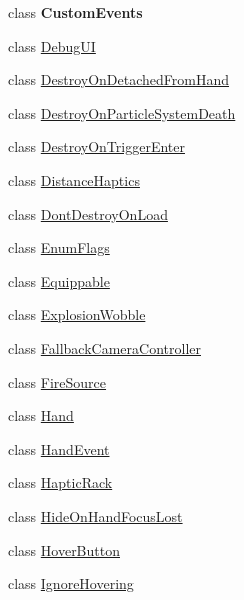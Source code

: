 \begin{DoxyCompactItemize}
class {\bfseries Custom\+Events}
\item 
class \mbox{\hyperlink{class_valve_1_1_v_r_1_1_interaction_system_1_1_debug_u_i}{Debug\+UI}}
\item 
class \mbox{\hyperlink{class_valve_1_1_v_r_1_1_interaction_system_1_1_destroy_on_detached_from_hand}{Destroy\+On\+Detached\+From\+Hand}}
\item 
class \mbox{\hyperlink{class_valve_1_1_v_r_1_1_interaction_system_1_1_destroy_on_particle_system_death}{Destroy\+On\+Particle\+System\+Death}}
\item 
class \mbox{\hyperlink{class_valve_1_1_v_r_1_1_interaction_system_1_1_destroy_on_trigger_enter}{Destroy\+On\+Trigger\+Enter}}
\item 
class \mbox{\hyperlink{class_valve_1_1_v_r_1_1_interaction_system_1_1_distance_haptics}{Distance\+Haptics}}
\item 
class \mbox{\hyperlink{class_valve_1_1_v_r_1_1_interaction_system_1_1_dont_destroy_on_load}{Dont\+Destroy\+On\+Load}}
\item 
class \mbox{\hyperlink{class_valve_1_1_v_r_1_1_interaction_system_1_1_enum_flags}{Enum\+Flags}}
\item 
class \mbox{\hyperlink{class_valve_1_1_v_r_1_1_interaction_system_1_1_equippable}{Equippable}}
\item 
class \mbox{\hyperlink{class_valve_1_1_v_r_1_1_interaction_system_1_1_explosion_wobble}{Explosion\+Wobble}}
\item 
class \mbox{\hyperlink{class_valve_1_1_v_r_1_1_interaction_system_1_1_fallback_camera_controller}{Fallback\+Camera\+Controller}}
\item 
class \mbox{\hyperlink{class_valve_1_1_v_r_1_1_interaction_system_1_1_fire_source}{Fire\+Source}}
\item 
class \mbox{\hyperlink{class_valve_1_1_v_r_1_1_interaction_system_1_1_hand}{Hand}}
\item 
class \mbox{\hyperlink{class_valve_1_1_v_r_1_1_interaction_system_1_1_hand_event}{Hand\+Event}}
\item 
class \mbox{\hyperlink{class_valve_1_1_v_r_1_1_interaction_system_1_1_haptic_rack}{Haptic\+Rack}}
\item 
class \mbox{\hyperlink{class_valve_1_1_v_r_1_1_interaction_system_1_1_hide_on_hand_focus_lost}{Hide\+On\+Hand\+Focus\+Lost}}
\item 
class \mbox{\hyperlink{class_valve_1_1_v_r_1_1_interaction_system_1_1_hover_button}{Hover\+Button}}
\item 
class \mbox{\hyperlink{class_valve_1_1_v_r_1_1_interaction_system_1_1_ignore_hovering}{Ignore\+Hovering}}

\end{DoxyCompactItemize}
